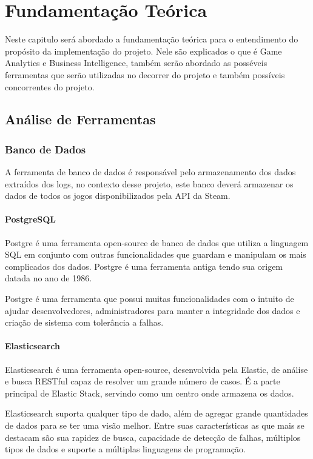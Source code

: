 \chapter*[Fundamentação Teórica]{Fundamentação Teórica}
Neste capitulo será abordado a fundamentação teórica para o entendimento do propósito da implementação do projeto. Nele são explicados o que é Game Analytics e Business Intelligence, também serão abordado as posséveis ferramentas que serão utilizadas no decorrer do projeto e também possíveis concorrentes do projeto.
\section*{Análise de Ferramentas}
\subsection*{Banco de Dados}
A ferramenta de banco de dados é responsável pelo armazenamento dos dados extraídos dos logs, no contexto desse projeto, este banco deverá armazenar os dados de todos os jogos disponibilizados pela API da Steam.
\subsubsection*{PostgreSQL}
Postgre é uma ferramenta open-source de banco de dados que utiliza a linguagem SQL em conjunto com outras funcionalidades que guardam e manipulam os mais complicados dos dados. Postgre é uma ferramenta antiga tendo sua origem datada no ano de 1986\cite{postgresql}.

Postgre é uma ferramenta que possui muitas funcionalidades com o intuito de ajudar desenvolvedores, administradores para manter a integridade dos dados e criação de sistema com tolerância a falhas.
\subsubsection*{Elasticsearch}
Elasticsearch é uma ferramenta open-source, desenvolvida pela Elastic, de análise e busca RESTful capaz de resolver um grande número de casos. É a parte principal de Elastic Stack, servindo como um centro onde armazena os dados\cite{elasticsearch}.

Elasticsearch suporta qualquer tipo de dado, além de agregar grande quantidades de dados para se ter uma visão melhor. Entre suas características as que mais se destacam são sua rapidez de busca, capacidade de detecção de falhas, múltiplos tipos de dados e suporte a múltiplas linguagens de programação.
